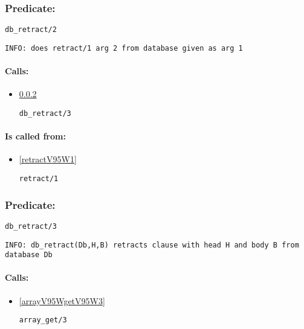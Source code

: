 \subsubsection{Predicate:} \label{dbV95WretractV95W2}

\begin{verbatim}
db_retract/2
\end{verbatim}

{\small \begin{verbatim}
INFO: does retract/1 arg 2 from database given as arg 1

\end{verbatim}}
\paragraph{Calls:} 
\begin{itemize}
\item \ref{dbV95WretractV95W3} 
\begin{verbatim}
db_retract/3
\end{verbatim}

\end{itemize}
\paragraph{Is called from:} 
\begin{itemize}
\item \ref{retractV95W1} 
\begin{verbatim}
retract/1
\end{verbatim}

\end{itemize}

\subsubsection{Predicate:} \label{dbV95WretractV95W3}

\begin{verbatim}
db_retract/3
\end{verbatim}

{\small \begin{verbatim}
INFO: db_retract(Db,H,B) retracts clause with head H and body B from database Db

\end{verbatim}}
\paragraph{Calls:} 
\begin{itemize}
\item \ref{arrayV95WgetV95W3} 
\begin{verbatim}
array_get/3
\end{verbatim}

\end{itemize}
